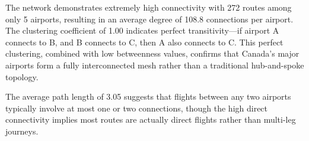 \documentclass[10pt]{article}
\begin{document}
The network demonstrates extremely high connectivity with 272 routes among only 5 airports, resulting in an average degree of 108.8 connections per airport. The clustering coefficient of 1.00 indicates perfect transitivity---if airport A connects to B, and B connects to C, then A also connects to C. This perfect clustering, combined with low betweenness values, confirms that Canada's major airports form a fully interconnected mesh rather than a traditional hub-and-spoke topology.

The average path length of 3.05 suggests that flights between any two airports typically involve at most one or two connections, though the high direct connectivity implies most routes are actually direct flights rather than multi-leg journeys.
\end{document}
